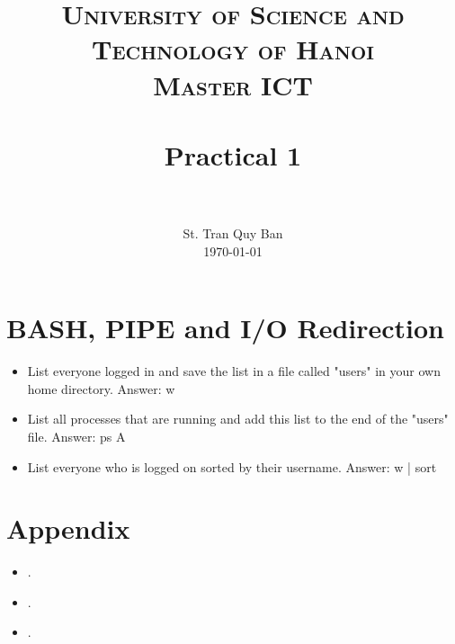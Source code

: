 \documentclass[paper=a4, fontsize=11pt]{scrartcl}
\title{
		\usefont{OT1}{bch}{b}{n}
		\normalfont \normalsize \textsc{University of Science and Technology of Hanoi \\ Master ICT} \\ [25pt]
		\horrule{0.5pt} \\[0.4cm]
		\huge Practical 1 \\
		\horrule{2pt} \\[0.5cm]
}
\author{
		\normalfont 								\normalsize
        St. Tran Quy Ban\\[-3pt]		\normalsize
        \today
}
\date{}
\numberwithin{equation}{section}		%
\numberwithin{figure}{section}			%
\numberwithin{table}{section}				%
\begin{document}
\maketitle

\section{BASH, PIPE and I/O Redirection}

\begin{itemize}
	\item List everyone logged in and save the list in a file called "users" in your own home directory.
	Answer: w
	\item List all processes that are running and add this list to the end of the "users" file.
	Answer: ps A
	\item List everyone who is logged on sorted by their username.
	Answer: w | sort
\end{itemize}

\section{Appendix}

\begin{itemize}
	\item .
	\item .
	\item .
\end{itemize}

\end{document}

